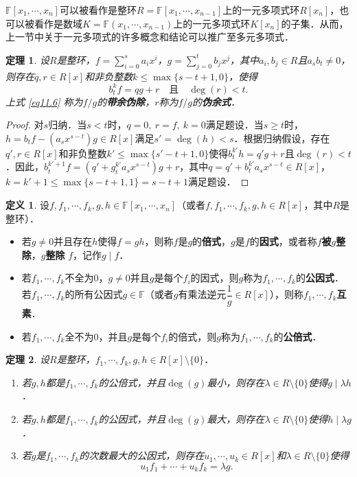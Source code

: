 \documentclass[a4paper,fontset=windows]{ctexbook}
\newtheorem{theorem}{定理}[chapter]
\theoremstyle{definition}
\newtheorem{definition}{定义}[chapter]
\renewcommand{\le}{\leqslant}
\renewcommand{\ge}{\geqslant}
\begin{document}
$\mathbb{F}[x_1,\cdots,x_n]$可以被看作是整环$R=\mathbb{F}[x_1,\cdots,x_{n-1}]$上的一元多项式环$R[x_n]$，也可以被看作是数域$K=\mathbb{F}(x_1,\cdots,x_{n-1})$上的一元多项式环$K[x_n]$的子集．从而，上一节中关于一元多项式的许多概念和结论可以推广至多元多项式．

\begin{theorem}
设$R$是整环，$f=\sum\limits_{i=0}^sa_ix^i$，$g=\sum\limits_{j=0}^tb_jx^j$，其中$a_i,b_j\in R$且$a_sb_t\ne 0$，则存在$q,r\in R[x]$和非负整数$k\le\max\{s-t+1,0\}$，使得
\begin{equation}\label{eq11.6}
b_t^kf=qg+r\quad\text{且}\quad\deg(r)<t.
\end{equation}
上式 \eqref{eq11.6} 称为$f/g$的{\bf 带余伪除}，$r$称为$f/g$的{\bf 伪余式}．
\end{theorem}

\begin{proof}
对$s$归纳．当$s<t$时，$q=0,~r=f,~k=0$满足题设．当$s\ge t$时，$h=b_tf-(a_sx^{s-t})g\in R[x]$满足$s'=\deg(h)<s$．根据归纳假设，存在$q',r\in R[x]$和非负整数$k'\le\max\{s'-t+1,0\}$使得$b_t^{k'}h=q'g+r$且$\deg(r)<t$．因此，$b_t^{k'+1}f=(q'+g_t^{k'}a_sx^{s-t})g+r$，其中$q=q'+b_t^{k'}a_sx^{s-t}\in R[x]$，$k=k'+1\le\max\{s-t+1,1\}=s-t+1$满足题设．
\end{proof}

\begin{definition}
设$f,f_1,\cdots,f_k,g,h\in\mathbb{F}[x_1,\cdots,x_n]$（或者$f,f_1,\cdots,f_k,g,h\in R[x]$，其中$R$是整环）．
\begin{itemize}
\item 若$g\ne 0$并且存在$h$使得$f=gh$，则称$f$是$g$的{\bf 倍式}，$g$是$f$的{\bf 因式}，或者称$f${\bf 被$g$整除}，$g${\bf 整除} $f$，记作$g\mid f$．

\item 若$f_1,\cdots,f_k$不全为0，$g\ne 0$并且$g$是每个$f_i$的因式，则$g$称为$f_1,\cdots,f_k$的{\bf 公因式}．若$f_1,\cdots,f_k$的所有公因式$g\in\mathbb{F}$（或者$g$有乘法逆元$\dfrac{1}{g}\in R[x]$），则称$f_1,\cdots,f_k${\bf 互素}．

\item 若$f_1,\cdots,f_k$全不为0，并且$g$是每个$f_i$的倍式，则$g$称为$f_1,\cdots,f_k$的{\bf 公倍式}．
\end{itemize}
\end{definition}

\begin{theorem}\label{thm11.17}
设$R$是整环，$f_1,\cdots,f_k,g,h\in R[x]\setminus\{0\}$．
\begin{enumerate}
\item 若$g,h$都是$f_1,\cdots,f_k$的公倍式，并且$\deg(g)$最小，则存在$\lambda\in R\setminus\{0\}$使得$g\mid\lambda h$．

\item 若$g,h$都是$f_1,\cdots,f_k$的公因式，并且$\deg(g)$最大，则存在$\lambda\in R\setminus\{0\}$使得$h\mid\lambda g$．

\item 若$g$是$f_1,\cdots,f_k$的次数最大的公因式，则存在$u_1,\cdots,u_k\in R[x]$和$\lambda\in R\setminus\{0\}$使得
$$u_1f_1+\cdots+u_kf_k=\lambda g.$$
\end{enumerate}
\end{theorem}
\end{document}
